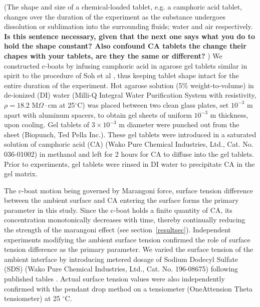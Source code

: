 \documentclass[journal=langd5, manuscript=article, layout=twocolumn]{achemso}
\begin{document}
(The shape and size of a chemical-loaded tablet, e.g. a camphoric acid tablet, changes over the duration of the experiment as the substance undergoes dissolution or sublimation into the surrounding fluids; water and air respectively. {\bf Is this sentence necessary, given that the next one says what you do to hold the shape constant? Also confound CA tablets the change their chapes with your tablets, are they the same or different? }) We constructed c-boats by infusing camphoric acid in agarose gel tablets similar in spirit to the procedure of Soh et al \cite{Soh2008}, thus keeping tablet shape intact for the entire duration of the experiment. Hot agarose solution (5\% weight-to-volume) in de-ionized (DI) water (Milli-Q Integral Water Purification System with resistivity, $\rho=18.2$ M$\Omega\cdot$cm at 25$^{\circ}$C) was placed between two clean glass plates, set $10^{-3}$ m apart with aluminum spacers, to obtain gel sheets of uniform $10^{-3}$ m thickness, upon cooling. Gel tablets of $3 \times 10^{-3}$ m diameter were punched out from the sheet (Biopunch, Ted Pella Inc.). These gel tablets were introduced in a saturated solution of camphoric acid (CA) (Wako Pure Chemical Industries, Ltd., Cat. No. 036-01002) in methanol and left for 2 hours for CA to diffuse into the gel tablets. Prior to experiments, gel tablets were rinsed in DI water to precipitate CA in the gel matrix. 

The c-boat motion being governed by Marangoni force, surface tension difference between the ambient surface and CA entering the surface forms the primary parameter in this study. Since the c-boat holds a finite quantity of CA, its concentration monotonically decreases with time, thereby continually reducing the strength of the marangoni effect (see section~\ref{resultsec}). Independent experiments modifying the ambient surface tension confirmed the role of surface tension difference as the primary parameter. We varied the surface tension of the ambient interface by introducing metered dosage of Sodium Dodecyl Sulfate (SDS) (Wako Pure Chemical Industries, Ltd., Cat. No. 196-08675) following published tables \cite{mysels1986}. Actual surface tension values were also independently confirmed with the pendant drop method on a tensiometer (OneAttension Theta tensiometer) at 25 $^{\circ}$C.
\end{document}

